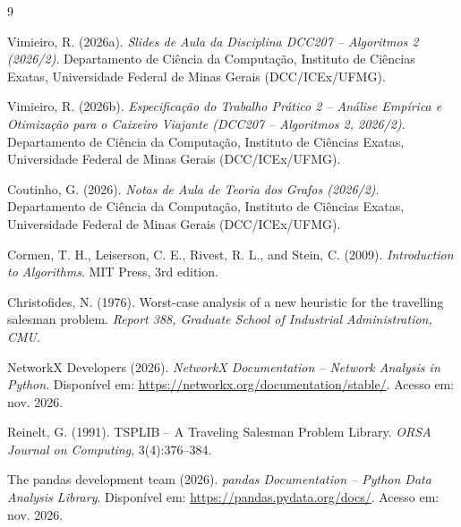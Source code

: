 \documentclass[12pt,a4paper]{article}
\renewcommand{\_}{\origunderscore\hspace{0pt}}
\begin{document}
\begin{thebibliography}{9}

Vimieiro, R. (2026a).
\newblock \emph{Slides de Aula da Disciplina DCC207 -- Algoritmos 2 (2026/2)}.
\newblock Departamento de Ciência da Computação, Instituto de Ciências Exatas, Universidade Federal de Minas Gerais (DCC/ICEx/UFMG).

Vimieiro, R. (2026b).
\newblock \emph{Especificação do Trabalho Prático 2 -- Análise Empírica e Otimização para o Caixeiro Viajante (DCC207 -- Algoritmos 2, 2026/2)}.
\newblock Departamento de Ciência da Computação, Instituto de Ciências Exatas, Universidade Federal de Minas Gerais (DCC/ICEx/UFMG).

Coutinho, G. (2026).
\newblock \emph{Notas de Aula de Teoria dos Grafos (2026/2)}.
\newblock Departamento de Ciência da Computação, Instituto de Ciências Exatas, Universidade Federal de Minas Gerais (DCC/ICEx/UFMG).

Cormen, T. H., Leiserson, C. E., Rivest, R. L., and Stein, C. (2009).
\newblock \emph{Introduction to Algorithms}.
\newblock MIT Press, 3rd edition.

Christofides, N. (1976).
\newblock Worst-case analysis of a new heuristic for the travelling salesman problem.
\newblock \emph{Report 388, Graduate School of Industrial Administration, CMU}.

NetworkX Developers (2026).
\newblock \emph{NetworkX Documentation -- Network Analysis in Python}.
\newblock Disponível em: \url{https://networkx.org/documentation/stable/}. Acesso em: nov. 2026.

Reinelt, G. (1991).
\newblock TSPLIB -- A Traveling Salesman Problem Library.
\newblock \emph{ORSA Journal on Computing}, 3(4):376--384.

The pandas development team (2026).
\newblock \emph{pandas Documentation -- Python Data Analysis Library}.
\newblock Disponível em: \url{https://pandas.pydata.org/docs/}. Acesso em: nov. 2026.

\end{thebibliography}

\appendix
\end{document}
